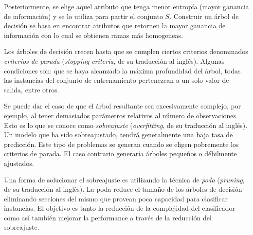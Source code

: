 	Posteriormente, se elige aquel atributo que tenga menor entropía (mayor ganancia de información) y se lo utiliza para partir el conjunto $S$. Construir un árbol de decisión se basa en encontrar atributos que retornen la mayor ganancia de información con lo cual se obtienen ramas más homogeneas.
	
	Los árboles de decisión crecen hasta que se cumplen ciertos criterios denominados \textit{criterios de parada} (\textit{stopping criteria}, de su traducción al inglés). Algunas condiciones son: que se haya alcanzado la máxima profundidad del árbol, todas las instancias del conjunto de entrenamiento pertenezcan a un solo valor de salida, entre otros.

	Se puede dar el caso de que el árbol resultante sea excesivamente complejo, por ejemplo, al tener demasiados parámetros relativos al número de observaciones. Esto es lo que se conoce como \textit{sobreajuste} (\textit{overfitting}, de su traducción al inglés). Un modelo que ha sido sobreajustado, tendrá generalmente una baja tasa de predicción. Este tipo de problemas se generan cuando se eligen pobremente los criterios de parada. El caso contrario generaría árboles pequeños o débilmente ajustados.
	
	Una forma de solucionar el sobreajuste es utilizando la técnica de \textit{poda} (\textit{pruning}, de su traducción al inglés). La poda reduce el tamaño de los árboles de decisión eliminando secciones del mismo que provean poca capacidad para clasificar instancias. El objetivo es tanto la reducción de la complejidad del clasificador como así también mejorar la performance a través de la reducción del sobreajuste.
	
